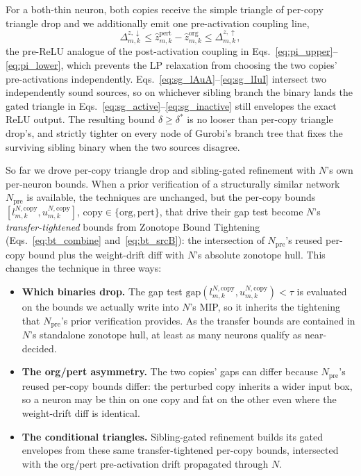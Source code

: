 \documentclass[11pt]{article}
\newcommand{\dexact}{\delta^*}
\begin{document}
For a both-thin neuron, both copies receive the simple triangle of per-copy triangle drop and we additionally emit one pre-activation coupling line,
\begin{equation}
  \Delta^{z,\downarrow}_{m,k} \le \hat z^{\mathrm{pert}}_{m,k} - \hat z^{\mathrm{org}}_{m,k} \le \Delta^{z,\uparrow}_{m,k},
  \label{eq:sg_coupling}
\end{equation}
the pre-ReLU analogue of the post-activation coupling in Eqs.~\eqref{eq:pi_upper}--\eqref{eq:pi_lower}, which prevents the LP relaxation from choosing the two copies' pre-activations independently. Eqs.~\eqref{eq:sg_lAuA}--\eqref{eq:sg_lIuI} intersect two independently sound sources, so on whichever sibling branch the binary lands the gated triangle in Eqs.~\eqref{eq:sg_active}--\eqref{eq:sg_inactive} still envelopes the exact ReLU output. The resulting bound $\delta \ge \dexact$ is no looser than per-copy triangle drop's, and strictly tighter on every node of Gurobi's branch tree that fixes the surviving sibling binary when the two sources disagree.

So far we drove per-copy triangle drop and sibling-gated refinement with $N$'s own per-neuron bounds. When a prior verification of a structurally similar network $N_\text{pre}$ is available, the techniques are unchanged, but the per-copy bounds $[l^{N,\mathrm{copy}}_{m,k}, u^{N,\mathrm{copy}}_{m,k}]$, $\mathrm{copy} \in \{\mathrm{org}, \mathrm{pert}\}$, that drive their gap test become $N$'s \emph{transfer-tightened} bounds from Zonotope Bound Tightening (Eqs.~\eqref{eq:bt_combine} and~\eqref{eq:bt_srcB}): the intersection of $N_\text{pre}$'s reused per-copy bound plus the weight-drift diff with $N$'s absolute zonotope hull. This changes the technique in three ways:
\begin{itemize}[noitemsep,topsep=2pt]
  \item \textbf{Which binaries drop.} The gap test
    $\mathrm{gap}(l^{N,\mathrm{copy}}_{m,k}, u^{N,\mathrm{copy}}_{m,k}) < \tau$ is evaluated on the bounds we
    actually write into $N$'s MIP, so it inherits the tightening that $N_\text{pre}$'s prior verification
    provides. As the transfer bounds are contained in $N$'s standalone zonotope hull, at least as many neurons
    qualify as near-decided.
  \item \textbf{The org/pert asymmetry.} The two copies' gaps can differ because $N_\text{pre}$'s reused
    per-copy bounds differ: the perturbed copy inherits a wider input box, so a neuron may be thin on one copy
    and fat on the other even where the weight-drift diff is identical.
  \item \textbf{The conditional triangles.} Sibling-gated refinement builds its gated envelopes from these
    same transfer-tightened per-copy bounds, intersected with the org/pert pre-activation drift propagated
    through $N$.
\end{itemize}
\end{document}
